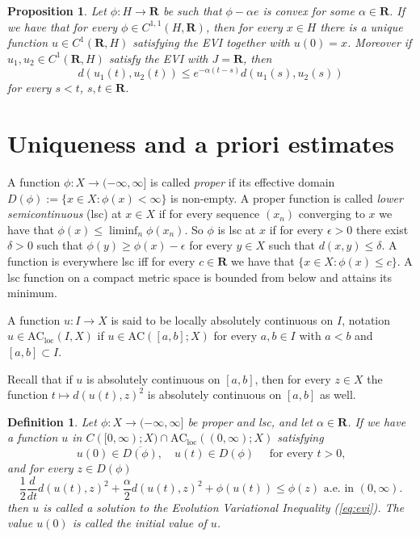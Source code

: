 \documentclass[a4paper,11pt, leqno]{scrreprt} %
\renewcommand{\leq}{\leqslant}
\renewcommand{\leq}{\leqslant}
\renewcommand{\geq}{\geqslant}
\newcommand{\R}{\mathbf R}
\theoremstyle{change}
\newcounter{acounter}[chapter]
\newtheorem{definition}[acounter]{Definition}
\newtheorem{proposition}[acounter]{Proposition}
\theoremstyle{nonumberplain}
\begin{document}
\begin{proposition}\label{prop:abscauchysol}
Let $\phi: H \to \R$ be such that $\phi - \alpha e$ is convex for some $\alpha \in \R$. If we have that for every $\phi \in C^{1,1}(H, \R)$, then for every $x \in H$ there is a unique function $u \in C^1(\R, H)$  satisfying the EVI together with $u(0) = x$. Moreover if $u_1, u_2 \in C^1(\R,H)$ satisfy the EVI with $J = \R$, then
\[
d(u_1(t), u_2(t)) \leq e^{-\alpha(t - s)} d(u_1(s), u_2(s))
\]
for every $s < t$, $s, t \in \R$.
\end{proposition}

\section{Uniqueness and a priori estimates}
A function $\phi: X \to (-\infty, \infty]$ is called \textit{proper}
if its effective domain $D(\phi) := \{x \in X : \phi(x) < \infty\}$ is
non-empty. A proper function is called \textit{lower semicontinuous}
(lsc) at $x \in X$ if for every sequence $(x_n)$ converging to $x$ we
have that $\phi(x) \leq \liminf_n \phi(x_n)$. So $\phi$ is lsc at $x$ if for
every $\epsilon > 0$ there exist $\delta > 0$ such that $\phi(y) \geq
\phi(x) - \epsilon$ for every $y \in X$ such that $d(x,y) \leq
\delta$. A function is everywhere lsc iff for every $c \in \R$ we have
that $\{x \in X : \phi(x) \leq c \}$. A lsc function on a compact
metric space is bounded from below and attains its minimum.

A function $u:I \to X$ is said to be locally absolutely continuous on $I$,
notation $u \in \text{AC}_\text{loc}(I, X)$ if $u \in \text{AC}([a,b];
X)$ for every $a,b \in I$ with $a < b$ and $[a,b] \subset I$.

Recall that if $u$ is absolutely continuous on $[a,b]$, then for every
$z \in X$ the function $t \mapsto d(u(t), z)^2$ is absolutely
continuous on $[a,b]$ as well.

\begin{definition}
Let $\phi : X \to (-\infty, \infty]$ be proper and lsc, and let
$\alpha \in \R$. If we have a function $u$ in $C([0, \infty); X) \cap
\text{AC}_\text{loc}((0, \infty); X)$ satisfying
\begin{equation}
  u(0) \in \overline{D(\phi)}, \quad u(t) \in D(\phi)\quad \text{ for
    every $t > 0$,}
\end{equation}
and for every $z \in D(\phi)$
\begin{equation}\tag{\Radioactivity}\label{eq:evi}
  \frac12 \frac d{dt} d(u(t), z)^2 + \frac\alpha2 d(u(t),z)^2 +
  \phi(u(t)) \leq \phi(z) \text{ a.e.\ in $(0, \infty)$.}
\end{equation}
then $u$ is called a solution to the Evolution Variational Inequality
(\eqref{eq:evi}). The value $u(0)$ is called the initial value of $u$.
\end{definition}
\end{document}
